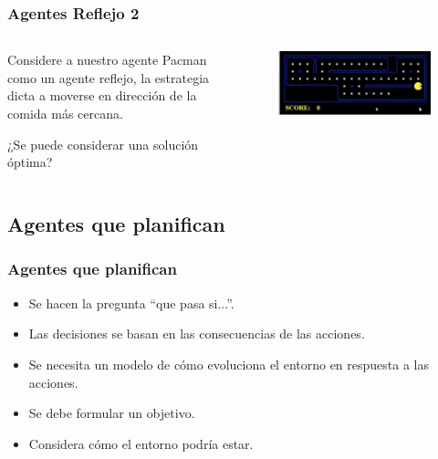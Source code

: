 \documentclass[10pt]{beamer}
\begin{document}
\begin{frame}
  \frametitle{Agentes Reflejo 2}
  \begin{columns}

    \begin{column}{0.4\textwidth}
      Considere a nuestro agente Pacman como un agente reflejo, la estrategia
      dicta a moverse en dirección de la comida más cercana.  
      
      ¿Se puede considerar una solución óptima?
    \end{column}
    
    \begin{column}{0.6\textwidth}
      \begin{figure}[!h] 
        \centering
        \includegraphics[width=1\textwidth]{img/pacman2}
      \end{figure}  
    \end{column}

  \end{columns}
\end{frame}

\subsection{Agentes que planifican}

\begin{frame}
  \frametitle{Agentes que planifican}
  \begin{itemize}
    \item Se hacen la pregunta ``que pasa si...''.
    \item Las decisiones se basan en las consecuencias de las acciones.
    \item Se necesita un modelo de cómo evoluciona el entorno en respuesta a las acciones.
    \item Se debe formular un \alert{objetivo}.
    \item Considera cómo el entorno \alert{podría estar}.
  \end{itemize}
\end{frame}
\end{document}

